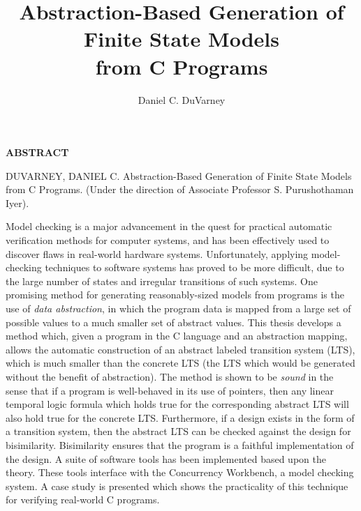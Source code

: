\documentclass[11pt]{ncsuthesis4}
\begin{document}
\newcommand{\puttitle}[0]{Abstraction-Based Generation of Finite
      State Models \\from C Programs}

\title{\puttitle}

\author{Daniel C. DuVarney}

\newpage
\thispagestyle{empty}
\begin{center}
\begin{large}
\textbf{ABSTRACT}
\end{large}
\end{center}
DUVARNEY, DANIEL C. \puttitle. (Under the direction of Associate Professor S. Purushothaman Iyer).

\renewcommand{\baselinestretch}{2}

\vspace{0.2in}

Model checking is a major advancement in the quest for
practical automatic verification methods for computer systems,
and
has been effectively used to discover
flaws in real-world hardware systems.
Unfortunately, applying model-checking techniques to
software systems
has proved to be more difficult, due to the large number of
states and irregular transitions of such systems.
One promising method for generating reasonably-sized
models from programs is the use of {\em data abstraction},
in which the program data is mapped from a large set of possible
values to a much smaller set of abstract values.
This thesis develops a method which,
given a program in the C language and an abstraction mapping,
allows the automatic construction of an
abstract labeled transition system (LTS), which
is much smaller than the concrete LTS
(the LTS which would be generated without the benefit of abstraction).
The method is shown to be {\em sound} in the sense that
if a program is well-behaved in its use of
pointers, then any linear temporal logic formula
which holds true for the corresponding abstract LTS 
will also hold true for the concrete LTS.
Furthermore, if a design exists in the form of a transition system,
then the abstract LTS can be checked against the design for bisimilarity.
Bisimilarity ensures that the program is a faithful implementation of
the design.
A suite of software tools has been implemented based upon
the theory. These tools interface
with the Concurrency Workbench, a model checking system.
A case study is presented which shows the practicality of this technique
for verifying real-world C programs.
\end{document}
